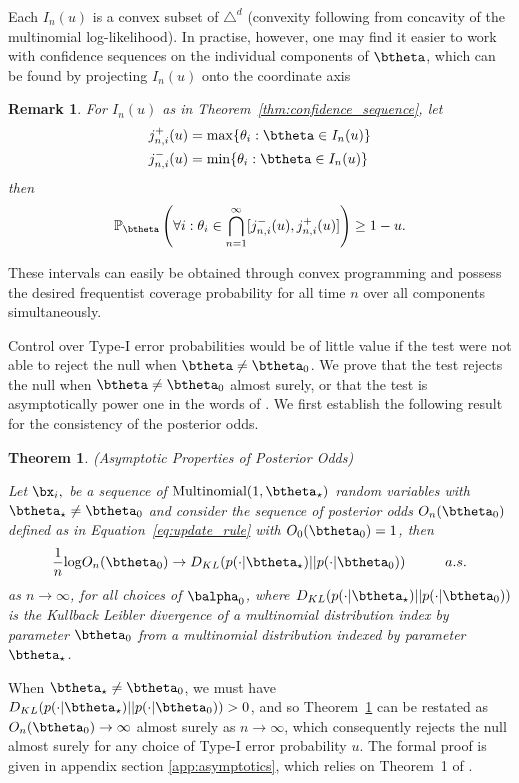 \documentclass[11pt]{article}
\def\log{{\rm log}}
\newtheorem{thm}{Theorem}[section]
\newtheorem{remark}{Remark}[section]
\begin{document}
\noindent Each $I_n(u)$ is a convex subset of $\triangle^d$ (convexity following from concavity of the multinomial log-likelihood). 
In practise, however, one may find it easier to work with confidence sequences on the individual components of $\btheta$, which can be found by projecting $I_n(u)$ onto the coordinate axis
\begin{remark}

\noindent For $I_n(u)$ as in Theorem~\ref{thm:confidence_sequence}, let
\begin{align*}
j_{n,i}^+(u) &= \max \{\theta_i : \btheta \in I_n(u)\}\\
j_{n,i}^-(u) &= \min \{\theta_i : \btheta \in I_n(u)\}\\
\end{align*}
then 
\begin{equation}
  \label{eq:marginal_confidence_sequence}
  \mathbb{P}_{\btheta}\left(
    \forall i: \theta_i \in \bigcap_{n=1}^{\infty} [j_{n,i}^-(u),j_{n,i}^+(u)]
  \right) \geq 1- u.
\end{equation} 
\end{remark}
\noindent These intervals can easily be obtained through convex programming and possess the desired frequentist coverage probability for all time $n$ over all components simultaneously.

Control over Type-I error probabilities would be of little value if the test were not able to reject the null when $\btheta \neq \btheta_0$. We prove that the test rejects the null when $\btheta \neq \btheta_0$ almost surely, or that the test is asymptotically power one in the words of \cite{robbins}.
We first establish the following result for the consistency of the posterior odds.
\begin{thm}(Asymptotic Properties of Posterior Odds)
  
  \label{thm:consistency}
\noindent Let $\bx_i,$ be a sequence of $\text{Multinomial}(1,\btheta_{\star})$ random variables with $\btheta_{\star} \neq \btheta_0$ and consider the sequence of posterior odds $O_n(\btheta_0)$ defined as in Equation~\ref{eq:update_rule} with $O_0(\btheta_0)=1$, then
\begin{equation}
  \label{eq:consistency}
  \frac{1}{n} \log O_n(\btheta_0) \rightarrow D_{KL}(p(\cdot|\btheta_{\star}) || p(\cdot|\btheta_0)) \hspace{1cm} a.s.
\end{equation}
as $ n \rightarrow \infty$, for all choices of $\balpha_0$, where $D_{KL}(p(\cdot|\btheta_{\star}) || p(\cdot|\btheta_0))$ is the Kullback Leibler divergence of a multinomial distribution index by parameter $\btheta_0$ from a multinomial distribution indexed by parameter $\btheta_{\star}$.
\end{thm}
\noindent When $\btheta_{\star} \neq \btheta_0$, we must have $D_{KL}(p(\cdot|\btheta_{\star}) || p(\cdot|\btheta_0)) > 0$, and so Theorem~\ref{thm:consistency} can be restated as $O_n(\btheta_0) \rightarrow \infty$ almost surely as $ n \rightarrow \infty$, which consequently rejects the null almost surely for any choice of Type-I error probability $u$.
The formal proof is given in appendix section \ref{app:asymptotics}, which relies on Theorem~1 of \cite{walker}.
\end{document}
